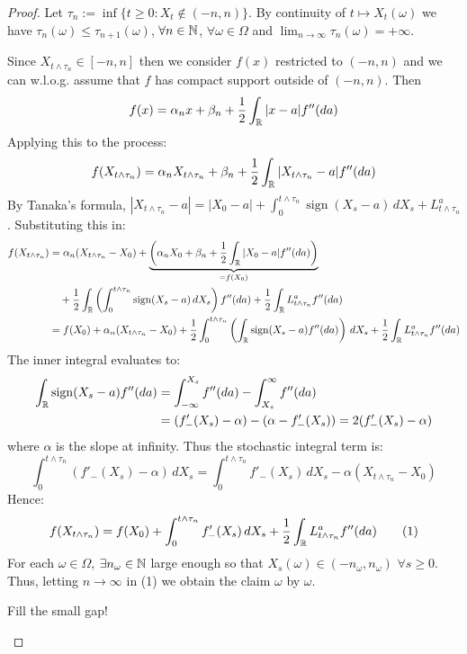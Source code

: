 \begin{proof}
    Let $\tau_n := \inf \{ t \geq 0 : X_t \notin (-n, n) \}$. By continuity of $t \mapsto X_t(\omega)$ we have $\tau_n(\omega) \leq \tau_{n+1}(\omega)$, $\forall n \in \mathbb N$, $\forall \omega \in \Omega$ and $\lim_{n \to \infty} \tau_n(\omega) = +\infty$.

    Since $X_{t \wedge \tau_n} \in [-n, n]$ then we consider $f(x)$ restricted to $(-n, n)$ and we can w.l.o.g. assume that $f$ has compact support outside of $(-n, n)$. Then 
    \[ f(x) = \alpha_n x + \beta_n + \frac{1}{2} \int_{\mathbb R} |x-a| f''(da) \]
    Applying this to the process:
    \[ f(X_{t \wedge \tau_n}) = \alpha_n X_{t \wedge \tau_n} + \beta_n + \frac{1}{2} \int_{\mathbb R} |X_{t \wedge \tau_n} - a| f''(da) \]
    By Tanaka's formula, $|X_{t \wedge \tau_n} - a| = |X_0 - a| + \int_0^{t \wedge \tau_n} \operatorname{sign}(X_s - a) \, dX_s + L_{t \wedge \tau_n}^a$. Substituting this in:
    \begin{align*}
        f(X_{t \wedge \tau_n}) &= \alpha_n (X_{t \wedge \tau_n} - X_0) + \underbrace{\left(\alpha_n X_0 + \beta_n + \frac{1}{2} \int_{\mathbb R} |X_0 - a| f''(da)\right)}_{= f(X_0)} \\
        &\quad + \frac{1}{2} \int_{\mathbb R} \left(\int_0^{t \wedge \tau_n} \operatorname{sign}(X_s - a) \, dX_s\right) f''(da) + \frac{1}{2} \int_{\mathbb R} L_{t \wedge \tau_n}^a f''(da) \\
        &= f(X_0) + \alpha_n (X_{t \wedge \tau_n} - X_0) + \frac{1}{2} \int_0^{t \wedge \tau_n} \left(\int_{\mathbb R} \operatorname{sign}(X_s - a) f''(da)\right) \, dX_s + \frac{1}{2} \int_{\mathbb R} L_{t \wedge \tau_n}^a f''(da)
    \end{align*}
    The inner integral evaluates to:
    \begin{align*}
        \int_{\mathbb R} \operatorname{sign}(X_s - a) f''(da) &= \int_{-\infty}^{X_s} f''(da) - \int_{X_s}^{\infty} f''(da) \\
        &= (f'_-(X_s) - \alpha) - (\alpha - f'_-(X_s)) = 2(f'_-(X_s) - \alpha)
    \end{align*}
    where $\alpha$ is the slope at infinity. Thus the stochastic integral term is:
    \[ \int_0^{t \wedge \tau_n} (f'_-(X_s) - \alpha) \, dX_s = \int_0^{t \wedge \tau_n} f'_-(X_s) \, dX_s - \alpha (X_{t \wedge \tau_n} - X_0) \]
    Hence:
    \begin{equation}
        f(X_{t \wedge \tau_n}) = f(X_0) + \int_0^{t \wedge \tau_n} f'_-(X_s) \, dX_s + \frac{1}{2} \int_{\mathbb R} L_{t \wedge \tau_n}^a f''(da) \tag{1}
    \end{equation}
    For each $\omega \in \Omega$, $\exists n_\omega \in \mathbb N$ large enough so that $X_s(\omega) \in (-n_\omega, n_\omega)$ $\forall s \geq 0$. Thus, letting $n \to \infty$ in (1) we obtain the claim $\omega$ by $\omega$.
    
    \begin{homework}
        Fill the small gap!
    \end{homework}
\end{proof}

